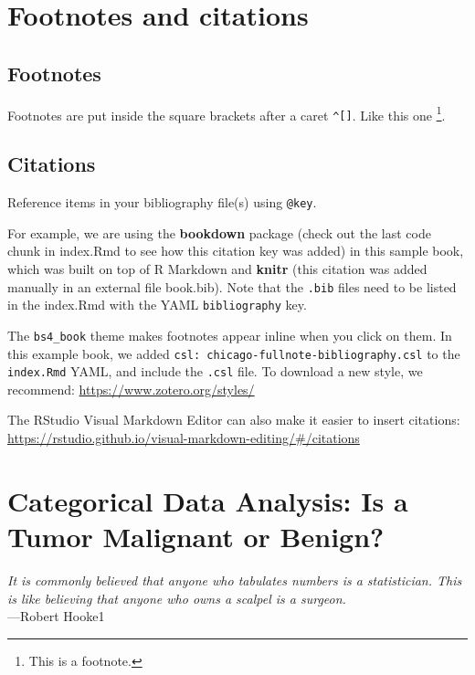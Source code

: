 \documentclass[
]{report}
\begin{document}
\chapter{Footnotes and citations}\label{footnotes-and-citations}

\section{Footnotes}\label{footnotes}

Footnotes are put inside the square brackets after a caret \texttt{\^{}{[}{]}}. Like this one \footnote{This is a footnote.}.

\section{Citations}\label{citations}

Reference items in your bibliography file(s) using \texttt{@key}.

For example, we are using the \textbf{bookdown} package \citep{R-bookdown} (check out the last code chunk in index.Rmd to see how this citation key was added) in this sample book, which was built on top of R Markdown and \textbf{knitr} \citep{xie2015} (this citation was added manually in an external file book.bib).
Note that the \texttt{.bib} files need to be listed in the index.Rmd with the YAML \texttt{bibliography} key.

The \texttt{bs4\_book} theme makes footnotes appear inline when you click on them. In this example book, we added \texttt{csl:\ chicago-fullnote-bibliography.csl} to the \texttt{index.Rmd} YAML, and include the \texttt{.csl} file. To download a new style, we recommend: \url{https://www.zotero.org/styles/}

The RStudio Visual Markdown Editor can also make it easier to insert citations: \url{https://rstudio.github.io/visual-markdown-editing/\#/citations}

\chapter{Categorical Data Analysis: Is a Tumor Malignant or Benign?}\label{categorical-data-analysis-is-a-tumor-malignant-or-benign}

{ \emph{It is commonly believed that anyone who tabulates numbers is a statistician. This is like believing that anyone who owns a scalpel is a surgeon.}}\\
{ ---Robert Hooke1}
\end{document}
